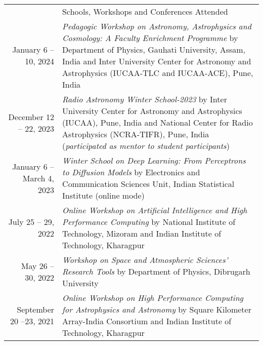 \documentclass[a4paper, 11pt]{article}
\newcommand{\headingfont}{\Large\color{Bittersweet}}
\newenvironment{SectionTable}[1]{
	\renewcommand*{\arraystretch}{1.7}
	\setlength{\tabcolsep}{10pt}
	\begin{longtable}{Rp{5.2in}} & #1 \\}
{\end{longtable}\vspace{-.3cm}}
\begin{document}

\begin{SectionTable}{\headingfont Schools, Workshops and Conferences Attended}

January 6 -- 10, 2024 &
\textit{Pedagogic Workshop on Astronomy, Astrophysics and Cosmology: A Faculty Enrichment Programme} by Department of Physics, Gauhati University, Assam, India and Inter University Center for Astronomy and Astrophysics (IUCAA-TLC and IUCAA-ACE), Pune, India
\\

December 12 -- 22, 2023 &
\textit{Radio Astronomy Winter School-2023} by Inter University Center for Astronomy and Astrophysics (IUCAA), Pune, India  and National Center for Radio Astrophysics (NCRA-TIFR), Pune, India (\textit{participated as mentor to student participants})
\\

January 6 -- March 4, 2023 &
\textit{Winter School on Deep Learning: From Perceptrons to Diffusion Models} by Electronics and Communication Sciences Unit, Indian Statistical Institute (online mode)
\\

July 25 -- 29, 2022 & 
\textit{Online Workshop on Artificial Intelligence and High Performance Computing} by National Institute of Technology, Mizoram and Indian Institute of Technology, Kharagpur
\\
	 
May 26 -- 30, 2022 &
\textit{Workshop on Space and Atmospheric Sciences' Research Tools} by Department of Physics, Dibrugarh University
\\


 
September 20 --23, 2021 & 
\textit{Online Workshop on High Performance Computing for Astrophysics and Astronomy} by Square Kilometer Array-India Consortium and Indian Institute of Technology, Kharagpur
 \\


\end{SectionTable}
\end{document}
